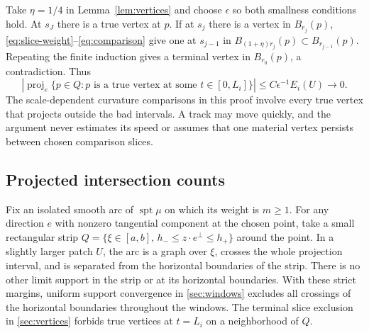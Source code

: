 Take \(\eta=1/4\) in Lemma~\ref{lem:vertices} and choose \(\epsilon\) so both smallness conditions hold. At \(s_J\) there is a true vertex at \(p\). If at \(s_j\) there is a vertex in \(B_{r_j}(p)\), \eqref{eq:slice-weight}--\eqref{eq:comparison} give one at \(s_{j-1}\) in \(B_{(1+\eta)r_j}(p)\subset B_{r_{j-1}}(p)\). Repeating the finite induction gives a terminal vertex in \(B_{r_0}(p)\), a contradiction. Thus \begin{equation}\label{eq:sweep}
\left|\operatorname{proj}_{e}
 \{p\in Q:p\text{ is a true vertex at some }t\in[0,L_i]\}\right|
 \le C\epsilon^{-1}E_i(U)\longrightarrow0.
\end{equation} The scale-dependent curvature comparisons in this proof involve every true vertex that projects outside the bad intervals. A track may move quickly, and the argument never estimates its speed or assumes that one material vertex persists between chosen comparison slices.

\subsection{Projected intersection counts}\label{sec:counts}

Fix an isolated smooth arc of \(\operatorname{spt}\mu\) on which its weight is \(m\ge1\). For any direction \(e\) with nonzero tangential component at the chosen point, take a small rectangular strip \(Q=\{\xi\in[a,b],\,h_-\le z\cdot e^\perp\le h_+\}\) around the point. In a slightly larger patch \(U\), the arc is a graph over \(\xi\), crosses the whole projection interval, and is separated from the horizontal boundaries of the strip. There is no other limit support in the strip or at its horizontal boundaries. With these strict margins, uniform support convergence in \cref{sec:windows} excludes all crossings of the horizontal boundaries throughout the windows. The terminal slice exclusion in \cref{sec:vertices} forbids true vertices at \(t=L_i\) on a neighborhood of \(Q\).

